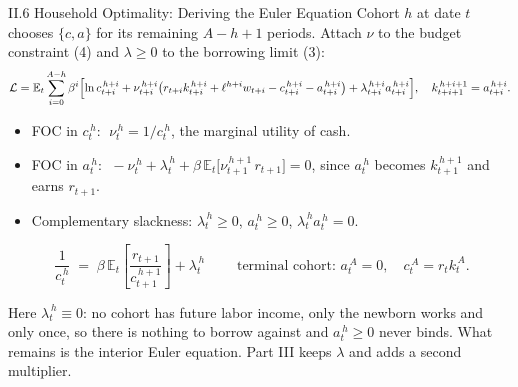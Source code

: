 \documentclass[aspectratio=169,11pt]{beamer}
\newcommand{\emphc}[1]{\textcolor{harvardcrimson}{#1}}
\begin{document}
\begin{frame}{II.6 Household Optimality: Deriving the Euler Equation}
\footnotesize
Cohort $h$ at date $t$ chooses $\{c,a\}$ for its remaining $A-h+1$ periods.  Attach $\nu$ to the
budget constraint (4) and $\lambda\ge 0$ to the borrowing limit (3):
\[
\mathcal{L} = \mathbb{E}_t\sum_{i=0}^{A-h}\beta^i\Bigl[\ln c_{t+i}^{\,h+i}
 + \nu_{t+i}^{\,h+i}\bigl(r_{t+i}k_{t+i}^{\,h+i} + \ell^{h+i}w_{t+i} - c_{t+i}^{\,h+i} - a_{t+i}^{\,h+i}\bigr)
 + \lambda_{t+i}^{\,h+i}a_{t+i}^{\,h+i}\Bigr],
\quad k_{t+i+1}^{\,h+i+1} = a_{t+i}^{\,h+i}.
\]
\vspace{-6pt}
\begin{itemize}\itemsep1pt
    \item FOC in $c_t^{\,h}$: $\;\nu_t^{\,h} = 1/c_t^{\,h}$, the marginal utility of cash.
    \item FOC in $a_t^{\,h}$: $\;-\nu_t^{\,h} + \lambda_t^{\,h} + \beta\,\mathbb{E}_t\bigl[\nu_{t+1}^{\,h+1}\,r_{t+1}\bigr] = 0$,
          since $a_t^{\,h}$ becomes $k_{t+1}^{\,h+1}$ and earns $r_{t+1}$.
    \item Complementary slackness: $\lambda_t^{\,h}\ge 0$, $a_t^{\,h}\ge 0$, $\lambda_t^{\,h}a_t^{\,h}=0$.
\end{itemize}
\vspace{2pt}
\[
\boxed{\;\frac{1}{c_t^{\,h}} \;=\; \beta\,\mathbb{E}_t\!\left[\frac{r_{t+1}}{c_{t+1}^{\,h+1}}\right] + \lambda_t^{\,h}\;}
\qquad\text{terminal cohort: } a_t^{\,A}=0,\quad c_t^{\,A} = r_t k_t^{\,A}.
\]
\vspace{2pt}
{\scriptsize \emphc{Here $\lambda_t^{\,h}\equiv 0$}: no cohort has future labor income, only the newborn works
and only once, so there is nothing to borrow against and $a_t^{\,h}\ge 0$ never binds.  What remains is the
\emphc{interior} Euler equation.  Part III keeps $\lambda$ and adds a second multiplier.\par}
\end{frame}
\end{document}
